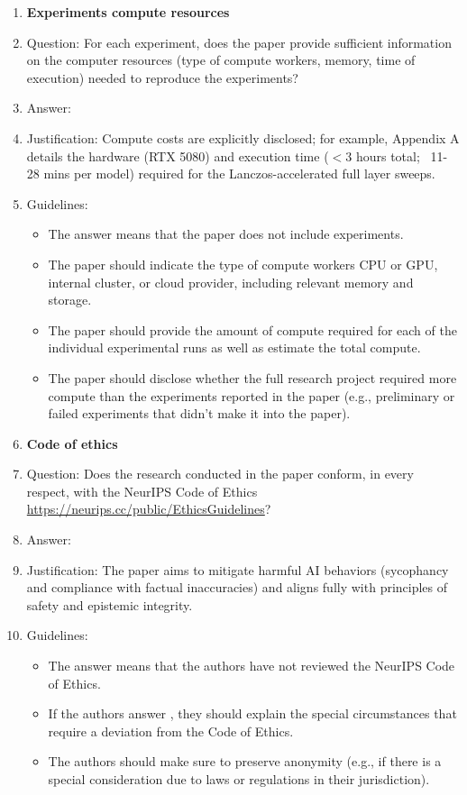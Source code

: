 \documentclass{article}
\begin{document}
\begin{enumerate}
\item {\bf Experiments compute resources}
    \item[] Question: For each experiment, does the paper provide sufficient information on the computer resources (type of compute workers, memory, time of execution) needed to reproduce the experiments?
    \item[] Answer: \answerYes{}
    \item[] Justification: Compute costs are explicitly disclosed; for example, Appendix A details the hardware (RTX 5080) and execution time ($<3$ hours total; ~11-28 mins per model) required for the Lanczos-accelerated full layer sweeps.
    \item[] Guidelines:
    \begin{itemize}
        \item The answer \answerNA{} means that the paper does not include experiments.
        \item The paper should indicate the type of compute workers CPU or GPU, internal cluster, or cloud provider, including relevant memory and storage.
        \item The paper should provide the amount of compute required for each of the individual experimental runs as well as estimate the total compute. 
        \item The paper should disclose whether the full research project required more compute than the experiments reported in the paper (e.g., preliminary or failed experiments that didn't make it into the paper). 
    \end{itemize}
    
\item {\bf Code of ethics}
    \item[] Question: Does the research conducted in the paper conform, in every respect, with the NeurIPS Code of Ethics \url{https://neurips.cc/public/EthicsGuidelines}?
    \item[] Answer: \answerYes{}
    \item[] Justification: The paper aims to mitigate harmful AI behaviors (sycophancy and compliance with factual inaccuracies) and aligns fully with principles of safety and epistemic integrity.
    \item[] Guidelines:
    \begin{itemize}
        \item The answer \answerNA{} means that the authors have not reviewed the NeurIPS Code of Ethics.
        \item If the authors answer \answerNo, they should explain the special circumstances that require a deviation from the Code of Ethics.
        \item The authors should make sure to preserve anonymity (e.g., if there is a special consideration due to laws or regulations in their jurisdiction).
    \end{itemize}



\end{enumerate}
\end{document}
